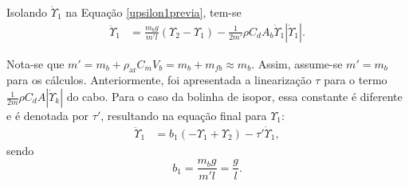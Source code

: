  Isolando $\ddot{\Upsilon}_1$ na Equação \ref{upsilon1previa}, tem-se \begin{align}
 	\ddot{\Upsilon}_1 &= \frac{m_b g}{m'l}\left(\Upsilon_2 - \Upsilon_1\right)  - \frac{1}{2m'}\rho C_d A_b \dot{\Upsilon}_1 \left|\dot{\Upsilon}_1\right|.
 \end{align} 
 
  Nota-se que $m' = m_b + \rho_{\textrm{ar}} C_m V_b = m_b + m_{fb} \approx m_b$. Assim, assume-se $m' = m_b$ para os cálculos. Anteriormente, foi apresentada a linearização $\tau$ para o termo $\frac{1}{2m}\rho C_d A\left|\dot{\Upsilon}_k\right|$ do cabo. Para o caso da bolinha de isopor, essa constante é diferente e é denotada por $\tau'$, resultando na equação final para $\Upsilon_1$: \begin{align}
 	\ddot{\Upsilon}_1 &= b_1\left(-\Upsilon_1 + \Upsilon_2\right) - \tau'\dot{\Upsilon}_1\label{upsilon1final},
 \end{align} sendo \begin{equation}
 	b_1 = \frac{m_b g}{m'l} = \frac{g}{l}.
 \end{equation}

